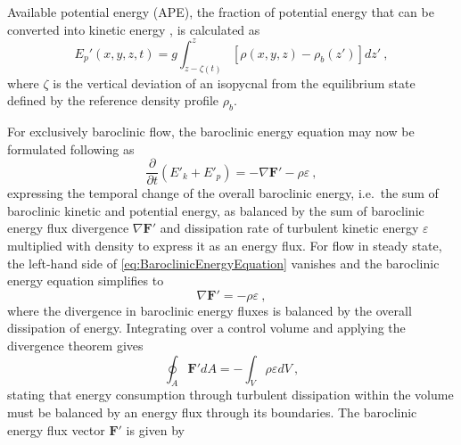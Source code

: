 \documentclass{ametsocV6.1}
\begin{document}
Available potential energy (APE), the fraction of potential energy that can be converted into kinetic energy \citep[e.g.][]{hollidaymcintyre81,wintersetal95,kangfringer10,lamb08}, is calculated as
\begin{equation}
    E_p'(x,y,z,t) = g \int_{z-\zeta(t)}^z [\rho(x,y,z)-\rho_b(z')]dz'\ ,
\label{eq:AvailablePotentialEnergy}
\end{equation}
where $\zeta$ is the vertical deviation of an isopycnal from the equilibrium state defined by the reference density profile $\rho_b$.

For exclusively baroclinic flow, the baroclinic energy equation may now be formulated following \citet{kang10} as
\begin{equation}
\frac{\partial}{\partial t} \left( E'_k + E'_p \right) = - \nabla \mathbf{F'} - \rho \varepsilon\ ,
\label{eq:BaroclinicEnergyEquation}
\end{equation}
expressing the temporal change of the overall baroclinic energy, i.e.\ the sum of baroclinic kinetic and potential energy, as balanced by the sum of baroclinic energy flux divergence $\nabla \mathbf{F'}$ and dissipation rate of turbulent kinetic energy $\varepsilon$ multiplied with density to express it as an energy flux.
For flow in steady state, the left-hand side of \eqref{eq:BaroclinicEnergyEquation} vanishes and the baroclinic energy equation simplifies to
\begin{equation}
\nabla \mathbf{F'} = - \rho \varepsilon\ ,
\label{eq:SteadyStateBaroclinicEnergyEquation}
\end{equation}
where the divergence in baroclinic energy fluxes is balanced by the overall dissipation of energy.
Integrating over a control volume and applying the divergence theorem gives
\begin{equation}
\oint_A \mathbf{F'} dA = -\int_V \rho \varepsilon dV\ ,
\label{eq:BaroclinicEnergyEquationIntegralForm}
\end{equation}
stating that energy consumption through turbulent dissipation within the volume must be balanced by an energy flux through its boundaries.
The baroclinic energy flux vector $\mathbf{F'}$ is given by
\end{document}
